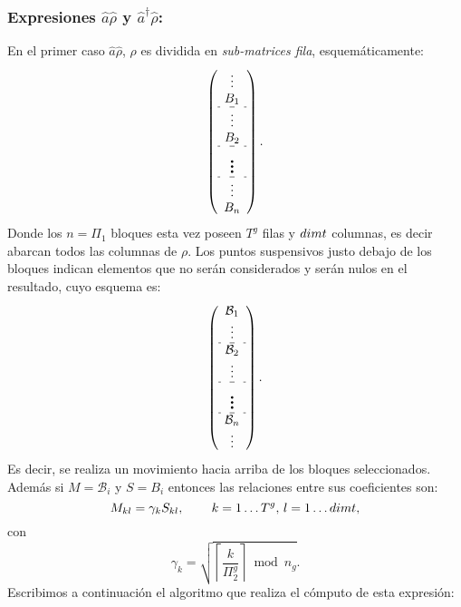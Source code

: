 \subsubsection*{Expresiones $\hat{a}\hat{\rho}$ y $\hat{a}^{\dag}\hat{\rho}$: } \quad En el primer caso $\hat{a}\hat{\rho}$, $\rho$ es dividida en \emph{sub-matrices fila}, esquem\'aticamente:\begin{equation}\left(
 \begin{array}{c}
\vdots\\
B_{1} \\\hdashline
\vdots\\
B_{2}\\\hdashline
\multirow{2}{*}{\Huge$\vdots$}\\
\\\hdashline
\vdots\\
B_{n}
 \end{array}\right).\label{ec:esquema_rho_arho}
\end{equation}
\quad Donde los $n=\Pi_1$ bloques esta vez poseen $T^g$ filas y $dimt$ columnas, es decir abarcan todos las columnas de $\rho$. Los puntos suspensivos justo debajo de los bloques indican elementos que no ser\'an considerados y ser\'an nulos en el resultado, cuyo esquema es:\begin{equation}\left(
 \begin{array}{c}
\mathcal{B}_{1} \\
\vdots\\\hdashline
\mathcal{B}_{2}\\
\vdots\\\hdashline
\multirow{2}{*}{\Huge$\vdots$}\\
\\\hdashline
\mathcal{B}_{n}\\
\vdots
 \end{array}\right).
\end{equation}
 \quad Es decir, se realiza un movimiento hacia arriba de los bloques seleccionados. Adem\'as si $M=\mathcal{B}_{i}$ y $S=B_{i}$ entonces las relaciones entre sus coeficientes son:\begin{equation}
M_{kl}=\gamma_{k}S_{kl},\,\qquad k=1\ldots T^g,\,l=1\ldots dimt, \label{ec:bloque_arM}
\end{equation}
con\begin{equation}
 \gamma_{k}=\sqrt{\left\lceil \frac{k}{\Pi_2^g} \right\rceil\bmod n_g}.\label{ec:coef_gammas_arMod}
\end{equation}
\quad Escribimos a continuaci\'on el algoritmo que realiza el c\'omputo de esta expresi\'on:

